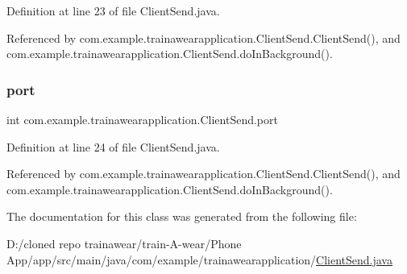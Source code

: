 Definition at line 23 of file Client\+Send.\+java.



Referenced by com.\+example.\+trainawearapplication.\+Client\+Send.\+Client\+Send(), and com.\+example.\+trainawearapplication.\+Client\+Send.\+do\+In\+Background().

\mbox{\label{classcom_1_1example_1_1trainawearapplication_1_1_client_send_a1295f5916c4527127a9dd68b7c6fe759}} 
\subsubsection{\texorpdfstring{port}{port}}
{\footnotesize\ttfamily int com.\+example.\+trainawearapplication.\+Client\+Send.\+port\hspace{0.3cm}{\ttfamily [private]}}



Definition at line 24 of file Client\+Send.\+java.



Referenced by com.\+example.\+trainawearapplication.\+Client\+Send.\+Client\+Send(), and com.\+example.\+trainawearapplication.\+Client\+Send.\+do\+In\+Background().



The documentation for this class was generated from the following file\+:\begin{DoxyCompactItemize}
\item 
D\+:/cloned repo trainawear/train-\/\+A-\/wear/\+Phone App/app/src/main/java/com/example/trainawearapplication/\mbox{\hyperlink{_client_send_8java}{Client\+Send.\+java}}\end{DoxyCompactItemize}
